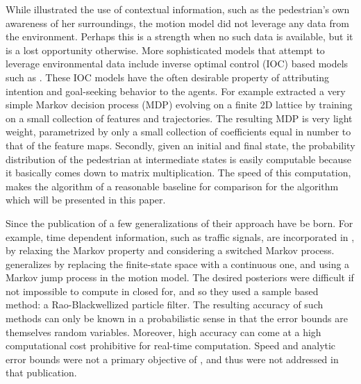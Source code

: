 \documentclass[conference]{IEEEtran}
\begin{document}
While \cite{Kooji2014} illustrated the use of contextual information, such as the pedestrian's own awareness of her surroundings, the motion model did not leverage any data from the environment.
Perhaps this is a strength when no such data is available, but it is a lost opportunity otherwise.
More sophisticated models that attempt to leverage environmental data include inverse optimal control (IOC) based models such as \cite{Ziebart2008,Ziebart2009,Kitani2012,Karasev2016}.
These IOC models have the often desirable property of attributing intention and goal-seeking behavior to the agents.
For example \citet{Kitani2012} extracted a very simple Markov decision process (MDP) evolving on a finite 2D lattice by training on a small collection of features and trajectories.
The resulting MDP is very light weight, parametrized by only a small collection of coefficients equal in number to that of the feature maps.
Secondly, given an initial and final state, the probability distribution of the pedestrian at intermediate states is easily computable because it basically comes down to matrix multiplication.
The speed of this computation, makes the algorithm of \cite{Kitani2012} a reasonable baseline for comparison for the algorithm which will be presented in this paper.

Since the publication of \cite{Kitani2012} a few generalizations of their approach have be born.
For example, time dependent information, such as traffic signals, are incorporated in \cite{Karasev2016}, by relaxing the Markov property and considering a switched Markov process.
\citet{Karasev2016} generalizes \cite{Kitani2012} by replacing the finite-state space with a continuous one, and using a Markov jump process in the motion model.
The desired posteriors were difficult if not impossible to compute in closed for, and so they used a sample based method: a Rao-Blackwellized particle filter\cite{Doucet2000}.
The resulting accuracy of such methods can only be known in a probabilistic sense in that the error bounds are themselves random variables.
Moreover, high accuracy can come at a high computational cost prohibitive for real-time computation.
Speed and analytic error bounds were not a primary objective of \cite{Karasev2016}, and thus were not addressed in that publication.

\end{document}
